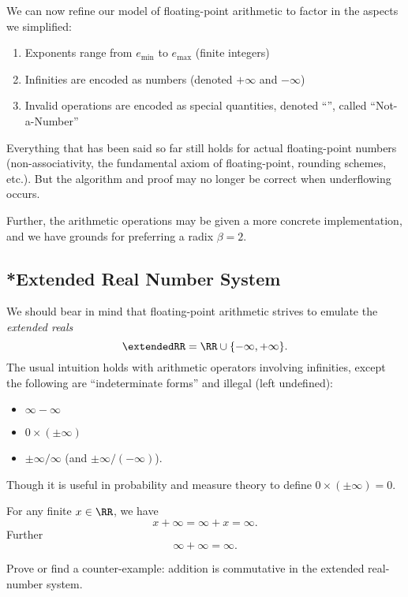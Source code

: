 We can now refine our model of floating-point arithmetic to factor in
the aspects we simplified:
\begin{enumerate}
\item Exponents range from $e_{\text{min}}$ to $e_{\text{max}}$ (finite integers)
\item Infinities are encoded as numbers (denoted $+\infty$ and $-\infty$)
\item Invalid operations are encoded as special quantities, denoted
  ``\NaN'', called ``Not-a-Number''
\end{enumerate}
Everything that has been said so far still holds for actual 
floating-point numbers (non-associativity, the fundamental axiom of
floating-point, rounding schemes, etc.). But the algorithm and proof may
no longer be correct when underflowing occurs.

Further, the arithmetic operations may be given a more concrete
implementation, and we have grounds for preferring a radix $\beta=2$.

\subsection{*Extended Real Number System}\label{subsec:computer:extended-real-number-system}

We should bear in mind that  floating-point arithmetic strives
to emulate the \emph{extended reals}
\begin{equation}
  \extendedRR = \RR\cup\{-\infty,+\infty\}.
\end{equation}
The usual intuition holds with arithmetic operators involving
infinities, except the following are ``indeterminate forms'' and illegal
(left undefined):
\begin{itemize}
\item $\infty-\infty$
\item $0\times(\pm\infty)$
\item $\pm\infty/\infty$ (and $\pm\infty/(-\infty)$).
\end{itemize}
Though it is useful in probability and measure theory to define
$0\times(\pm\infty)=0$.

\begin{axiom}[Addition]
  For any finite $x\in\RR$, we have
  $$x+\infty=\infty+x=\infty.$$
  Further
  $$\infty+\infty=\infty.$$
\end{axiom}


\begin{xca}
  Prove or find a counter-example: addition is commutative in the
  extended real-number system.
\end{xca}


